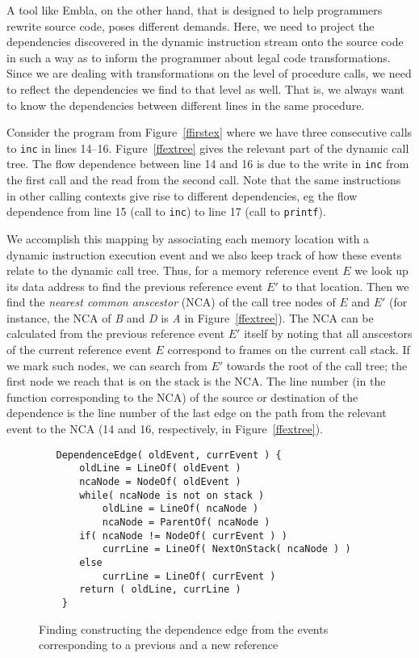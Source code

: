 A tool like Embla, on the other hand, that is designed to help programmers 
rewrite source code, poses different demands. Here, we need to project 
the dependencies discovered in the dynamic instruction stream onto the 
source code in such a way as to inform the programmer about legal code 
transformations. Since we are dealing with transformations on the level of
procedure calls, we need to reflect the dependencies we find to that level 
as well. That is, we always want to know the dependencies between different 
lines in the same procedure.

Consider the program from Figure~\ref{ffirstex} where we have three consecutive
calls to {\tt inc} in lines 14--16. Figure~\ref{ffextree} gives the relevant 
part of the dynamic call tree. The flow dependence between line 14 and 16 is due 
to the write in {\tt inc} from the first call and the read from the second call.
Note that the same instructions in other calling contexts give rise to 
different dependencies, eg the flow dependence from line 15 (call to {\tt inc})
to line 17 (call to {\tt printf}).

We accomplish this mapping by associating each memory location with a dynamic
instruction execution event and we also keep track of how these events 
relate to the dynamic call tree. Thus, for a memory reference event $E$ we 
look up its data address to find the previous reference event $E'$ to that 
location. Then we find the {\em nearest common anscestor} (NCA) of the call
tree nodes of $E$ and $E'$ (for instance, the NCA of {\it B} and {\it D} is
{\it A} in Figure~\ref{ffextree}). The NCA can be calculated from the previous
reference event $E'$ itself by noting that all anscestors of the current
reference event $E$ correspond to frames on the current call stack. If we mark 
such nodes, we can search from $E'$ 
towards the root of the call tree; the first node we reach that is on the 
stack is the NCA.
The line number (in the function corresponding to the NCA) of the source or 
destination of the dependence is the line number of the last edge on the path 
from the relevant event to the NCA (14 and 16, respectively, in 
Figure~\ref{ffextree}).


\begin{figure}
\small
\hrulefill
\begin{verbatim}
   DependenceEdge( oldEvent, currEvent ) {
       oldLine = LineOf( oldEvent ) 
       ncaNode = NodeOf( oldEvent )
       while( ncaNode is not on stack )
           oldLine = LineOf( ncaNode )
           ncaNode = ParentOf( ncaNode )
       if( ncaNode != NodeOf( currEvent ) )
           currLine = LineOf( NextOnStack( ncaNode ) )
       else
           currLine = LineOf( currEvent )
       return ( oldLine, currLine )
    }
\end{verbatim}
\hrulefill
\caption{Finding constructing the dependence edge from the events corresponding
to a previous and a new reference}
\label{fdepedge}
\end{figure}    

